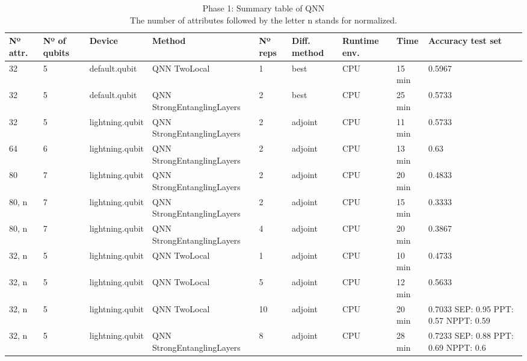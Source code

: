 \begin{table}[]
    \centering
    \begin{adjustbox}{width=\textwidth}
    \setlength{\tabcolsep}{10pt} %
    \renewcommand{\arraystretch}{1.5} %
    \begin{tabular}{p{}p{}p{}p{}p{}p{}p{}p{}p{}}
        \toprule
        Nº attr. & Nº of qubits & Device & Method & Nº reps & Diff. method & Runtime env. & Time & Accuracy test set\\
         \hline
        32 & 5 & default.qubit & QNN \newline TwoLocal & 1 & best & CPU & 15 min & 0.5967 \\
        32 & 5 & default.qubit & QNN Strong\-Entangling\-Layers & 2 & best & CPU & 25 min & 0.5733 \\
        32 & 5 & lightning.qubit & QNN Strong\-Entangling\-Layers & 2 & adjoint & CPU & 11 min & 0.5733 \\
        64 & 6 & lightning.qubit & QNN Strong\-Entangling\-Layers & 2 & adjoint & CPU & 13 min & 0.63 \\
        80 & 7 & lightning.qubit & QNN Strong\-Entangling\-Layers & 2 & adjoint & CPU & 20 min & 0.4833 \\
        80, n & 7 & lightning.qubit & QNN Strong\-Entangling\-Layers & 2 & adjoint & CPU & 15 min & 0.3333 \\
        80, n & 7 & lightning.qubit & QNN Strong\-Entangling\-Layers & 4 & adjoint & CPU & 20 min & 0.3867 \\
        32, n & 5 & lightning.qubit & QNN \newline TwoLocal & 1 & adjoint & CPU & 10 min & 0.4733 \\
        32, n & 5 & lightning.qubit & QNN \newline TwoLocal & 5 & adjoint & CPU & 12 min & 0.5633 \\
        32, n & 5 & lightning.qubit & QNN \newline TwoLocal & 10 & adjoint & CPU & 20 min & 0.7033 SEP: 0.95 PPT: 0.57 NPPT: 0.59  \\
        32, n & 5 & lightning.qubit & QNN Strong\-Entangling\-Layers & 8 & adjoint & CPU & 28 min & 0.7233 SEP: 0.88 PPT: 0.69 NPPT: 0.6 \\
        
    \end{tabular}
    \end{adjustbox}
    \caption{Phase 1: Summary table of QNN \\ The number of attributes followed by the letter n stands for normalized.}
    \label{tab:phase1-QNN}
\end{table}

